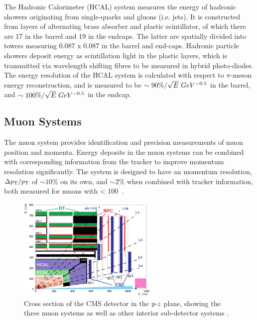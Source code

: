 The Hadronic Calorimeter (HCAL) system measures the energy of hadronic showers 
originating from single-quarks and gluons (i.e. jets). It is constructed from
layers of alternating brass absorber and plastic scintillator, of which there
are 17 in the barrel and 19 in the endcaps. The latter are spatially
divided into towers measuring 0.087 x 0.087 in the barrel and end-caps. Hadronic
particle showers deposit energy as scintillation light in the plastic layers,
which is transmitted via wavelength shifting fibres to be measured in hybrid
photo-diodes. The energy resolution of the HCAL system is calculated with
respect to $\pi$-meson energy reconstruction, and is measured to be
$\sim 90\%/\sqrt{E}~GeV^{-0.5}$ in the barrel, and $\sim 100\%/\sqrt{E}~GeV^{-0.5}$ in the endcap.

\subsection{Muon Systems}


The muon system provides identification and precision measurements of
muon position and momenta. Energy deposits in the muon systems can be combined
with corresponding information from the tracker to improve momentum resolution
significantly. The system is designed to have an momentum resolution,
$\Delta {p_{\text T}}/{p_{\text T}}$ of
$\sim10\%$ on its own, and $\sim2\%$ when combined with tracker information,
both measured for muons with \Pt < 100~\gev.

\begin{figure}[ht!]
\centering
\includegraphics[width=0.6\textwidth]{Figs/machine/pictures_MuonSys-mod3.png}
\caption{Cross section of the CMS detector in the $y{\hbox{-}} z$ plane,
showing the three muon systems as well as other interior sub-detector systems
\cite{Bayatian:922757}.}
\label{fig:muon_system_diagram}
\end{figure}

